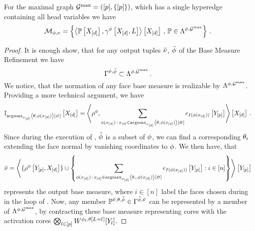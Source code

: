 \begin{theorem}%
    For the maximal graph $\mathcal{G}^{\mathrm{max}}=([p],\{[p]\})$, which has a single hyperedge containing all head variables we have
    \begin{align*}
        \mathcal{M}_{\phi,\nu} = \left\{ \left\langle \mathbb{P}\left[X_{[d]}\right],\gamma^{\phi}\left[X_{[d]},L\right]\right\rangle \left[ X_{[d]} \right] \, , \, \mathbb{P} \in\Lambda^{\phi,\mathcal{G}^{\mathrm{max}}} \right\} \, .
    \end{align*}
\end{theorem}
\begin{proof}
    It is enough show, that for any output tuples $\tilde{\nu}$, $\tilde{\phi}$ of the Base Measure Refinement  we have
    \[ \Gamma^{\tilde{\nu},\tilde{\phi}} \subset  \Lambda^{\phi,\mathcal{G}^{\mathrm{max}}} \, . \]
    We notice, that the normation of any face base measure is realizable by $\Lambda^{\phi,\mathcal{G}^{\mathrm{max}}}$. %
    Providing a more technical argument, we have
    \begin{align*}
        \mathbb{I}_{\mathrm{argmax}_{x_{[d]}} \left\langle \theta,\phi(x_{[d]})\right\rangle \left[ \varnothing \right]}\left[X_{[d]}\right]
        = \left\langle 
            \rho^{\phi},
            \sum_{\phi(x_{[d]}) \, : \, x_{[d]} \in \mathrm{argmax}_{x_{[d]}} \left\langle \theta,\phi(x_{[d]})\right\rangle \left[ \varnothing \right] }
            e_{I(\phi(x_{[d]}))}\left[Y_{[p]}\right]
        \right\rangle \left[ X_{[d]} \right] \, .
    \end{align*}
    Since during the execution of , $\tilde{\phi}$ is a subset of $\phi$, we can find a corresponding $\theta_{i}$ extending the face normal by vanishing coordinates to $\phi$.
    We then have, that
    \begin{align*}
        \tilde{\nu} = \left\langle 
            \{\rho^{\phi}\left[Y_{[p]},X_{[d]}\right]\} \cup
            \left\{\sum_{\phi(x_{[d]}) \, : \, x_{[d]} \in \mathrm{argmax}_{x_{[d]}} \left\langle \theta_{i},\phi(x_{[d]})\right\rangle \left[ \varnothing \right] }
            e_{I(\phi(x_{[d]}))}\left[Y_{[p]}\right]
            : i \in [n] \right\}
        \right\rangle \left[ Y_{[p]} \right]
    \end{align*}
    represents the output base measure, where $i\in[n]$ label the faces chosen during in the loop of .
    Now, any member $\mathbb{P}^{\tilde{\nu},\theta,\tilde{\phi}}\in\Gamma^{\tilde{\phi},\tilde{\nu}}$ can be represented by a member of  $\Lambda^{\phi,\mathcal{G}^{\mathrm{max}}}$, by contracting these base measure representing cores with the activation cores $\bigotimes_{l\in[p]}W^{\phi_{l},\theta\left[L_{}=l_{}\right]}[Y_{l}]$.
\end{proof}


